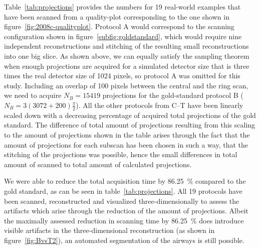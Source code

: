 \begin{figure*}
	\centering
	\caption[Quality-Plot of 19 scanned protocols]{Quality-Plot of 19 scanned protocols. The red dots show the expected quality of the different protocols, the black plot is a polynomial fit $p(x)$ with $n=4$ for $p(x)=p_{1}x^{n}+p_{2}x^{n-1}+\cdots+p_{n}x+p_{n+1}$.}%
	\label{fig:2008c-qualityplot}%
\end{figure*}
\cbstart
Table~\ref{tab:projections} provides the numbers for 19 real-world examples that have been scanned from a quality-plot corresponding to the one shown in figure~\ref{fig:2008c-qualityplot}. Protocol A would correspond to the scanning configuration shown in figure~\ref{subfig:goldstandard}, which would require nine independent reconstructions and stitching of the resulting small reconstructions into one big slice. As shown above, we can equally satisfy the sampling theorem when enough projections are acquired for a simulated detector size that is three times the real detector size of 1024 pixels, so protocol A was omitted for this study. Including an overlap of 100 pixels between the central and the ring scan, we need to acquire $N_{B}=15419$ projections for the gold-standard protocol B ($N_{B}=3(3072+200)\frac{\pi}{2}$). All the other protocols from C--T have been linearly scaled down with a decreasing percentage of acquired total projections of the gold standard. The difference of total amount of projections resulting from this scaling to the amount of projections shown in the table arises through the fact that the amount of projections for each subscan has been chosen in such a way, that the stitching of the projections was possible, hence the small differences in total amount of scanned to total amount of calculated projections.

We were able to reduce the total acquisition time by \SI{86.25}{\percent} compared to the gold standard, as can be seen in table~\ref{tab:projections}. All 19 protocols have been scanned, reconstructed and visualized three-dimensionally to assess the artifacts which arise through the reduction of the amount of projections. Albeit the maximally assessed reduction in scanning time by \SI{86.25}{\percent} does introduce visible artifacts in the three-dimensional reconstruction (as shown in figure~\ref{fig:BvsT2}), an automated segmentation of the airways is still possible.
\cbend

